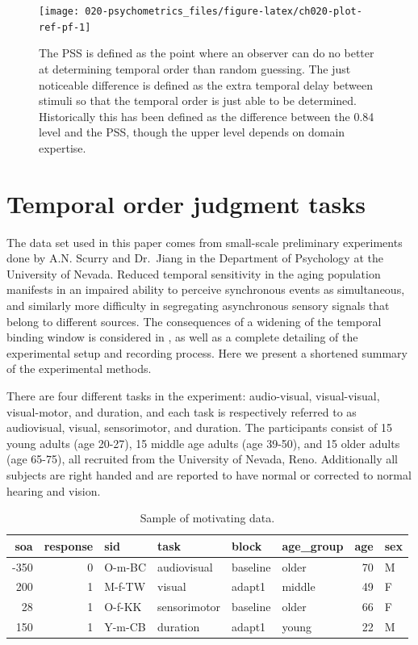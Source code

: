 \documentclass[11pt, oneside, openany]{scrbook}
\begin{document}
\begin{figure}

{\centering \texttt{[image: 020-psychometrics\_files/figure-latex/ch020-plot-ref-pf-1]} 

}

\caption{The PSS is defined as the point where an observer can do no better at determining temporal order than random guessing. The just noticeable difference is defined as the extra temporal delay between stimuli so that the temporal order is just able to be determined. Historically this has been defined as the difference between the 0.84 level and the PSS, though the upper level depends on domain expertise.}\label{fig:ch020-plot-ref-pf}
\end{figure}

\hypertarget{toj-task}{%
\section{Temporal order judgment tasks}\label{toj-task}}

The data set used in this paper comes from small-scale preliminary experiments done by A.N. Scurry and Dr.~Jiang in the Department of Psychology at the University of Nevada. Reduced temporal sensitivity in the aging population manifests in an impaired ability to perceive synchronous events as simultaneous, and similarly more difficulty in segregating asynchronous sensory signals that belong to different sources. The consequences of a widening of the temporal binding window is considered in \citet{scurry2019aging}, as well as a complete detailing of the experimental setup and recording process. Here we present a shortened summary of the experimental methods.

There are four different tasks in the experiment: audio-visual, visual-visual, visual-motor, and duration, and each task is respectively referred to as audiovisual, visual, sensorimotor, and duration. The participants consist of 15 young adults (age 20-27), 15 middle age adults (age 39-50), and 15 older adults (age 65-75), all recruited from the University of Nevada, Reno. Additionally all subjects are right handed and are reported to have normal or corrected to normal hearing and vision.

\begin{table}[!h]
\centering
\caption{\label{tab:ch020-multitask-data}Sample of motivating data.}
\centering
\begin{tabular}[t]{rrllllrl}
\toprule
soa & response & sid & task & block & age\_group & age & sex\\
\midrule
-350 & 0 & O-m-BC & audiovisual & baseline & older & 70 & M\\
200 & 1 & M-f-TW & visual & adapt1 & middle & 49 & F\\
28 & 1 & O-f-KK & sensorimotor & baseline & older & 66 & F\\
150 & 1 & Y-m-CB & duration & adapt1 & young & 22 & M\\
\bottomrule
\end{tabular}
\end{table}
\end{document}
